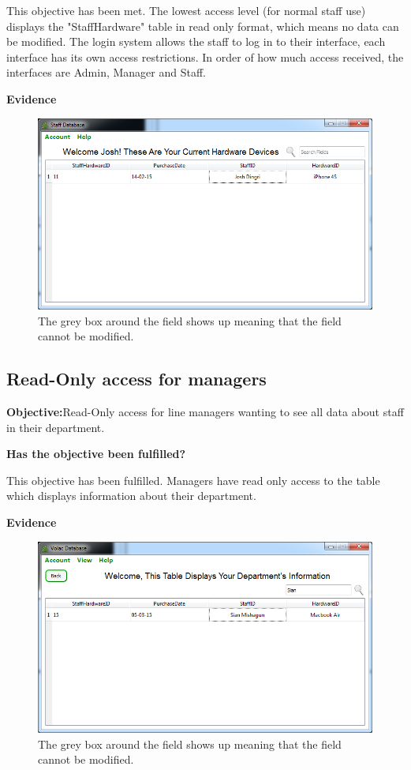This objective has been met. The lowest access level (for normal staff use) displays the "StaffHardware" table in read only format, which means no data can be modified. The login system allows the staff to log in to their interface, each interface has its own access restrictions. In order of how much access received, the interfaces are Admin, Manager and Staff.

\textbf{Evidence}

\begin{figure}[H]
    \includegraphics[width=\textwidth]{./Evaluation/Images/readonlystaff.png}
    \caption{The grey box around the field shows up meaning that the field cannot be modified.} 
\end{figure}



\subsection{Read-Only access for managers}

\textbf{Objective:}Read-Only access for line managers wanting to see all data about staff in their department.

\textbf{Has the objective been fulfilled?}

This objective has been fulfilled. Managers have read only access to the table which displays information about their department.

\textbf{Evidence}

\begin{figure}[H]
    \includegraphics[width=\textwidth]{./Evaluation/Images/readonlymanager.png}
    \caption{The grey box around the field shows up meaning that the field cannot be modified.} 
\end{figure}




